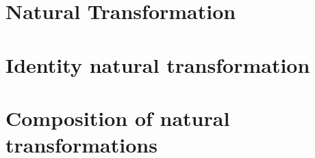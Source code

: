 \section{Natural Transformation}
    
\section{Identity natural transformation}
    
\section{Composition of natural transformations}
    

